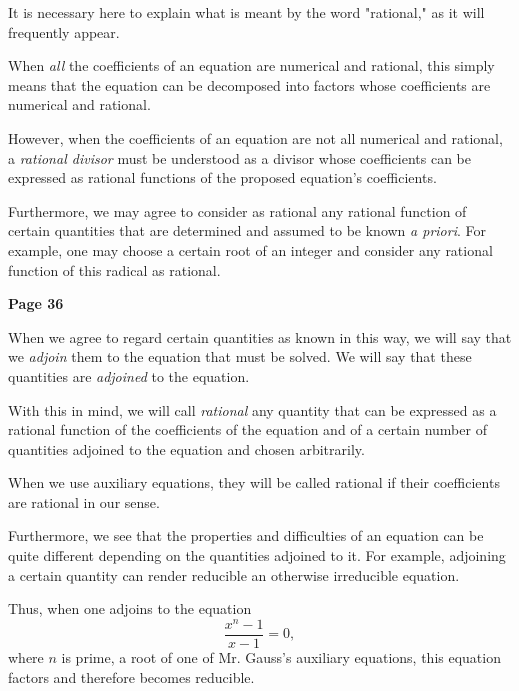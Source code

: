 \documentclass{article}
\begin{document}
It is necessary here to explain what is meant by the word "rational," as it will frequently appear.

When \textit{all} the coefficients of an equation are numerical and rational, this simply means that the equation can be decomposed into factors whose coefficients are numerical and rational.

However, when the coefficients of an equation are not all numerical and rational, a \textit{rational divisor} must be understood as a divisor whose coefficients can be expressed as rational functions of the proposed equation's coefficients.

Furthermore, we may agree to consider as rational any rational function of certain quantities that are determined and assumed to be known \textit{a priori}. For example, one may choose a certain root of an integer and consider any rational function of this radical as rational.

\medskip

\newpage
\centerline{\textbf{Page 36}}

\medskip

When we agree to regard certain quantities as known in this way, we will say that we \emph{adjoin} them to the equation that must be solved. We will say that these quantities are \emph{adjoined} to the equation.

\smallskip

With this in mind, we will call \emph{rational} any quantity that can be expressed as a rational function of the coefficients of the equation and of a certain number of quantities adjoined to the equation and chosen arbitrarily.

\smallskip

When we use auxiliary equations, they will be called rational if their coefficients are rational in our sense.

\smallskip

Furthermore, we see that the properties and difficulties of an equation can be quite different depending on the quantities adjoined to it. For example, adjoining a certain quantity can render reducible an otherwise irreducible equation.

\smallskip

Thus, when one adjoins to the equation
\[
\frac{x^n - 1}{x-1} = 0,
\]
where $n$ is prime, a root of one of Mr. Gauss's auxiliary equations, this equation factors and therefore becomes reducible.

\smallskip
\end{document}
